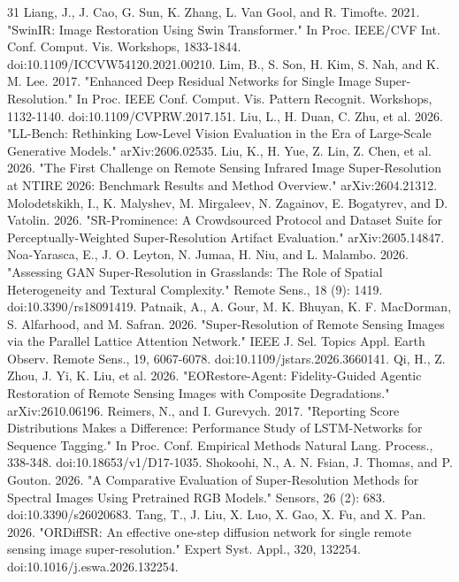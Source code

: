 \documentclass{interact}
\begin{document}
\begin{thebibliography}{31}
Liang, J., J. Cao, G. Sun, K. Zhang, L. Van Gool, and R. Timofte. 2021. "SwinIR: Image Restoration Using Swin Transformer." In Proc. IEEE/CVF Int. Conf. Comput. Vis. Workshops, 1833-1844. doi:10.1109/ICCVW54120.2021.00210.
Lim, B., S. Son, H. Kim, S. Nah, and K. M. Lee. 2017. "Enhanced Deep Residual Networks for Single Image Super-Resolution." In Proc. IEEE Conf. Comput. Vis. Pattern Recognit. Workshops, 1132-1140. doi:10.1109/CVPRW.2017.151.
Liu, L., H. Duan, C. Zhu, et al. 2026. "LL-Bench: Rethinking Low-Level Vision Evaluation in the Era of Large-Scale Generative Models." arXiv:2606.02535.
Liu, K., H. Yue, Z. Lin, Z. Chen, et al. 2026. "The First Challenge on Remote Sensing Infrared Image Super-Resolution at NTIRE 2026: Benchmark Results and Method Overview." arXiv:2604.21312.
Molodetskikh, I., K. Malyshev, M. Mirgaleev, N. Zagainov, E. Bogatyrev, and D. Vatolin. 2026. "SR-Prominence: A Crowdsourced Protocol and Dataset Suite for Perceptually-Weighted Super-Resolution Artifact Evaluation." arXiv:2605.14847.
Noa-Yarasca, E., J. O. Leyton, N. Jumaa, H. Niu, and L. Malambo. 2026. "Assessing GAN Super-Resolution in Grasslands: The Role of Spatial Heterogeneity and Textural Complexity." Remote Sens., 18 (9): 1419. doi:10.3390/rs18091419.
Patnaik, A., A. Gour, M. K. Bhuyan, K. F. MacDorman, S. Alfarhood, and M. Safran. 2026. "Super-Resolution of Remote Sensing Images via the Parallel Lattice Attention Network." IEEE J. Sel. Topics Appl. Earth Observ. Remote Sens., 19, 6067-6078. doi:10.1109/jstars.2026.3660141.
Qi, H., Z. Zhou, J. Yi, K. Liu, et al. 2026. "EORestore-Agent: Fidelity-Guided Agentic Restoration of Remote Sensing Images with Composite Degradations." arXiv:2610.06196.
Reimers, N., and I. Gurevych. 2017. "Reporting Score Distributions Makes a Difference: Performance Study of LSTM-Networks for Sequence Tagging." In Proc. Conf. Empirical Methods Natural Lang. Process., 338-348. doi:10.18653/v1/D17-1035.
Shokoohi, N., A. N. Fsian, J. Thomas, and P. Gouton. 2026. "A Comparative Evaluation of Super-Resolution Methods for Spectral Images Using Pretrained RGB Models." Sensors, 26 (2): 683. doi:10.3390/s26020683.
Tang, T., J. Liu, X. Luo, X. Gao, X. Fu, and X. Pan. 2026. "ORDiffSR: An effective one-step diffusion network for single remote sensing image super-resolution." Expert Syst. Appl., 320, 132254. doi:10.1016/j.eswa.2026.132254.

\end{thebibliography}
\end{document}
